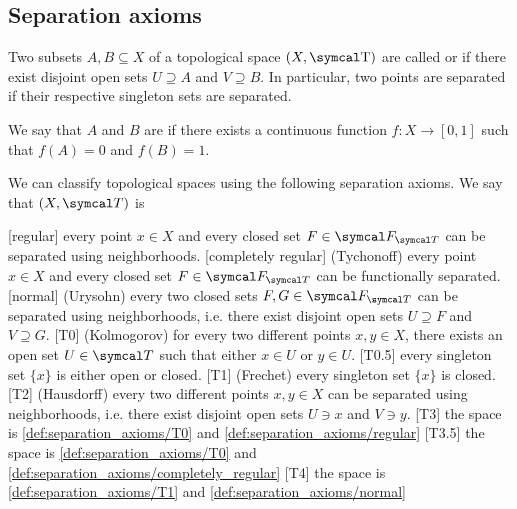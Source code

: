 \subsection{Separation axioms}\label{subsec:separation_axioms}

\begin{definition}\label{def:topological_space_separation}
  Two subsets \( A, B \subseteq X \) of a topological space \( (X, \T) \) are called  or  if there exist disjoint open sets \( U \supseteq A \) and \( V \supseteq B \). In particular, two points are separated if their respective singleton sets are separated.

  We say that \( A \) and \( B \) are  if there exists a continuous function \( f: X \to [0, 1] \) such that \( f(A) = 0 \) and \( f(B) = 1 \).
\end{definition}

\begin{definition}\label{def:separation_axioms}
  We can classify topological spaces using the following separation axioms. We say that \( (X, \Cal{T}) \) is

  \begin{description}
    [regular] every point \( x \in X \) and every closed set \( F \in \Cal{F}_{\Cal{T}} \) can be separated using neighborhoods.
    [completely regular] (Tychonoff) every point \( x \in X \) and every closed set \( F \in \Cal{F}_{\Cal{T}} \) can be functionally separated.
    [normal] (Urysohn) every two closed sets \( F, G \in \Cal{F}_{\Cal{T}} \) can be separated using neighborhoods, i.e. there exist disjoint open sets \( U \supseteq F \) and \( V \supseteq G \).
    [T0] (Kolmogorov) for every two different points \( x, y \in X \), there exists an open set \( U \in \Cal{T} \) such that either \( x \in U \) or \( y \in U \).
    [T0.5] every singleton set \( \{ x \} \) is either open or closed.
    [T1] (Frechet) every singleton set \( \{ x \} \) is closed.
    [T2] (Hausdorff) every two different points \( x, y \in X \) can be separated using neighborhoods, i.e. there exist disjoint open sets \( U \ni x \) and \( V \ni y \).
    [T3] the space is \ref{def:separation_axioms/T0} and \ref{def:separation_axioms/regular}
    [T3.5] the space is \ref{def:separation_axioms/T0} and \ref{def:separation_axioms/completely_regular}
    [T4] the space is \ref{def:separation_axioms/T1} and \ref{def:separation_axioms/normal}
  \end{description}
\end{definition}

